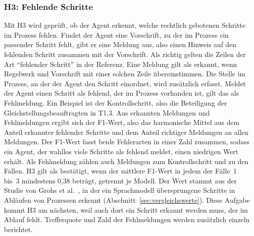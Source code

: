 \subsubsection{H3: Fehlende Schritte}
Mit H3 wird geprüft, ob der Agent erkennt, welche rechtlich gebotenen Schritte im Prozess fehlen.
Findet der Agent eine Vorschrift, zu der im Prozess ein passender Schritt fehlt, gibt er eine Meldung aus, also einen Hinweis auf den fehlenden Schritt zusammen mit der Vorschrift.
Als richtig gelten die Zeilen der Art \enquote{fehlender Schritt} in der Referenz.
Eine Meldung gilt als erkannt, wenn Regelwerk und Vorschrift mit einer solchen Zeile übereinstimmen.
Die Stelle im Prozess, an der der Agent den Schritt einordnet, wird zusätzlich erfasst.
Meldet der Agent einen Schritt als fehlend, der im Prozess vorhanden ist, gilt das als Fehlmeldung.
Ein Beispiel ist der Kontrollschritt, also die Beteiligung der Gleichstellungsbeauftragten in T1.3.
Aus erkannten Meldungen und Fehlmeldungen ergibt sich der F1-Wert, also das harmonische Mittel aus dem Anteil erkannter fehlender Schritte und dem Anteil richtiger Meldungen an allen Meldungen.
Der F1-Wert fasst beide Fehlerarten in einer Zahl zusammen, sodass ein Agent, der wahllos viele Schritte als fehlend meldet, einen niedrigen Wert erhält.
Als Fehlmeldung zählen auch Meldungen zum Kontrollschritt und zu den Fallen.
H3 gilt als bestätigt, wenn der mittlere F1-Wert in jedem der Fälle~1 bis~3 mindestens 0,38 beträgt, getrennt je Modell.
Der Wert stammt aus der Studie von Grohs et al.~\cite{grohs2025}, in der ein Sprachmodell übersprungene Schritte in Abläufen von Prozessen erkennt (Abschnitt~\ref{sec:vergleichswerte}).
Diese Aufgabe kommt H3 am nächsten, weil auch dort ein Schritt erkannt werden muss, der im Ablauf fehlt.
Trefferquote und Zahl der Fehlmeldungen werden zusätzlich einzeln berichtet.


